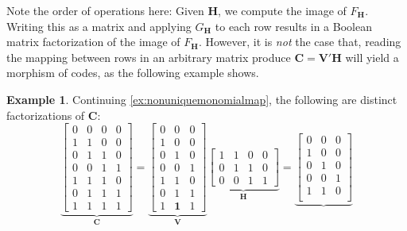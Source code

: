 \documentclass[11pt,letterpaper, reqno]{amsart}
\theoremstyle{definition}
\newtheorem{ex}[thm]{Example}        %
\def\bC{\mathbf{C}}
\def\bH{\mathbf{H}}
\def\bV{\mathbf{V}}
\begin{document}
        Note the order of operations here: Given $\bH$, we compute the image of $F_\bH$. Writing this as a matrix and applying $G_\bH$ to each row results in a Boolean matrix factorization of the image of $F_\bH$.
        However, it is \emph{not} the case that, reading the mapping between rows in an arbitrary matrix produce $\bC = \bV'\bH$ will yield a morphism of codes, as the following example shows.
        \begin{ex}
            Continuing \cref{ex:nonuniquemonomialmap}, 
            the following are distinct factorizations of $\bC$:
            \[\underbrace{\begin{bmatrix}
                0 & 0 & 0 & 0\\
                1 & 1 & 0 & 0\\
                0 & 1 & 1 & 0\\
                0 & 0 & 1 & 1\\
                1 & 1 & 1 & 0\\
                0 & 1 & 1 & 1\\
                1 & 1 & 1 & 1
                \end{bmatrix}}_{\mathbf{C}}
                =
                \underbrace{\begin{bmatrix}
                0 & 0 & 0\\
                1 & 0 & 0\\
                0 & 1 & 0\\
                0 & 0 & 1\\
                1 & 1 & 0\\
                0 & 1 & 1\\
                1 & \mathbf{1} & 1
                \end{bmatrix}}_{\mathbf{V}}
                \underbrace{\begin{bmatrix}
                1 & 1 & 0 & 0\\
                0 & 1 & 1 & 0\\
                0 & 0 & 1 & 1
                \end{bmatrix}}_{\bH}
                =
                \underbrace{\begin{bmatrix}
                0 & 0 & 0\\
                1 & 0 & 0\\
                0 & 1 & 0\\
                0 & 0 & 1\\
                1 & 1 & 0\\

\end{bmatrix}}\]
\end{ex}
\end{document}
